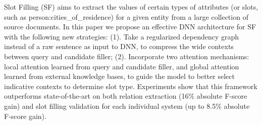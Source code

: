 Slot Filling (SF) aims to extract the values of certain types of attributes (or slots, such as person:cities\_of\_residence) for a given entity from a large collection of source documents. In this paper we propose an effective DNN architecture for SF with the following new strategies: (1). Take a regularized dependency graph instead of a raw sentence as input to DNN, to compress the wide contexts between query and candidate filler; (2). Incorporate two attention mechanisms: local attention learned from query and candidate filler, and global attention learned from external knowledge bases, to guide the model to better select indicative contexts to determine slot type. Experiments show that this framework outperforms state-of-the-art on both relation extraction (16\% absolute F-score gain) and slot filling validation for each individual system (up to 8.5\% absolute F-score gain).
